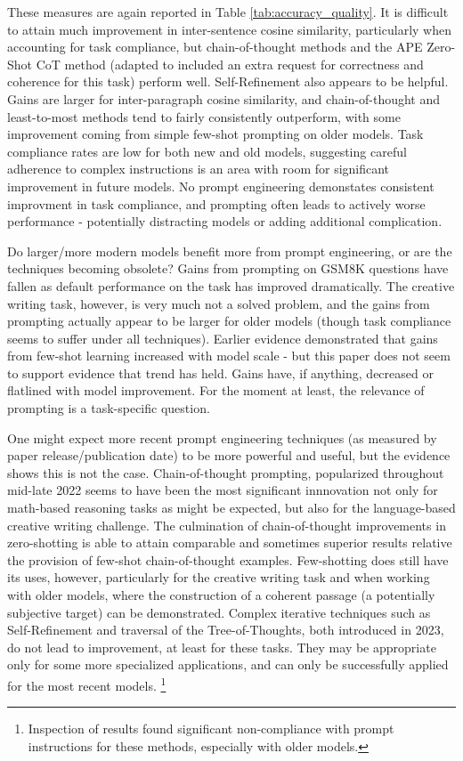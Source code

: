 \documentclass[11pt]{article}
\begin{document}

These measures are again reported in Table \ref{tab:accuracy_quality}. It is difficult to attain much improvement in inter-sentence cosine similarity, particularly when accounting for task compliance, but chain-of-thought methods and the APE Zero-Shot CoT method (adapted to included an extra request for correctness and coherence for this task) perform well. Self-Refinement also appears to be helpful. Gains are larger for inter-paragraph cosine similarity, and chain-of-thought and least-to-most methods tend to fairly consistently outperform, with some improvement coming from simple few-shot prompting on older models. Task compliance rates are low for both new and old models, suggesting careful adherence to complex instructions is an area with room for significant improvement in future models. No prompt engineering demonstates consistent improvment in task compliance, and prompting often leads to actively worse performance - potentially distracting models or adding additional complication.

Do larger/more modern models benefit more from prompt engineering, or are the techniques becoming obsolete? Gains from prompting on GSM8K questions have fallen as default performance on the task has improved dramatically. The creative writing task, however, is very much not a solved problem, and the gains from prompting actually appear to be larger for older models (though task compliance seems to suffer under all techniques). Earlier evidence demonstrated that gains from few-shot learning increased with model scale - but this paper does not seem to support evidence that trend has held. \cite{brown_language_2020} Gains have, if anything, decreased or flatlined with model improvement. For the moment at least, the relevance of prompting is a task-specific question.

One might expect more recent prompt engineering techniques (as measured by paper release/publication date) to be more powerful and useful, but the evidence shows this is not the case. Chain-of-thought prompting, popularized throughout mid-late 2022 seems to have been the most significant innnovation not only for math-based reasoning tasks as might be expected, but also for the language-based creative writing challenge. The culmination of chain-of-thought improvements in zero-shotting is able to attain comparable and sometimes superior results relative the provision of few-shot chain-of-thought examples. Few-shotting does still have its uses, however, particularly for the creative writing task and when working with older models, where the construction of a coherent passage (a potentially subjective target) can be demonstrated. Complex iterative techniques such as Self-Refinement and traversal of the Tree-of-Thoughts, both introduced in 2023, do not lead to improvement, at least for these tasks. They may be appropriate only for some more specialized applications, and can only be successfully applied for the most recent models. \footnote{Inspection of results found significant non-compliance with prompt instructions for these methods, especially with older models.}
\end{document}
